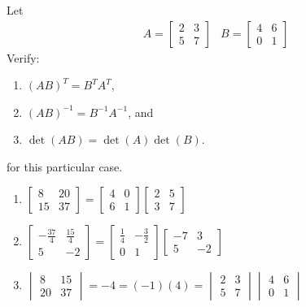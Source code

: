 \begin{Exercise}
Let
\begin{align*}
&A =
\begin{bmatrix}
2 & 3\\
5 & 7
\end{bmatrix}
&B =
\begin{bmatrix}
4 & 6\\
0 & 1
\end{bmatrix}  
\end{align*}
Verify:
\begin{enumerate}[label=(\alph*)]
\item $(AB)^T = B^TA^T$,
\item $(AB)^{-1} = B^{-1}A^{-1}$, and
\item $\det(AB) = \det(A)\det(B)$.
\end{enumerate} for this particular case.
\end{Exercise}
\begin{Answer}
\begin{enumerate}[label=(\alph*)]
\item 
$\begin{bmatrix}
8 & 20\\
15 & 37
\end{bmatrix}
=
\begin{bmatrix}
4 & 0 \\
6 & 1
\end{bmatrix}
\begin{bmatrix}
2 & 5 \\
3 & 7
\end{bmatrix}
$
\item $\begin{bmatrix}
-\frac{37}{4} & \frac{15}{4}\\
5 & -2    
\end{bmatrix} = 
\begin{bmatrix}
\frac{1}{4} & -\frac{3}{2}\\
0 & 1 
\end{bmatrix}
\begin{bmatrix}
-7 & 3\\
5 & -2  
\end{bmatrix}$
\item $\begin{vmatrix}
8 & 15\\
20 & 37
\end{vmatrix}
= -4 = (-1)(4) =
\begin{vmatrix}
2 & 3\\
5 & 7
\end{vmatrix}
\begin{vmatrix}
4 & 6\\
0 & 1
\end{vmatrix}$
\end{enumerate}
\end{Answer}

